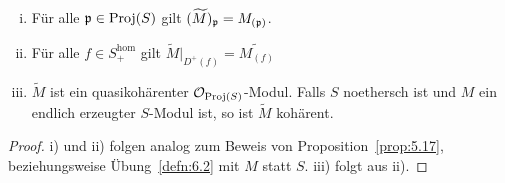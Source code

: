 \begin{prop}
\label{prop:9.17}
	\begin{enumerate}[i)]
		\item\label{prop:9.17:i} Für alle $\mathfrak{p} \in \operatorname{Proj}(S)$ gilt $(\widetilde{M})_{\mathfrak{p}} = M_{(\mathfrak{p})}$.
		\item\label{prop:9.17:ii} Für alle $f\in S_+^{\text{hom}}$ gilt $\widetilde{M}\vert_{D^+(f)} = \widetilde{M_{(f)}}$
		\item\label{prop:9.17:iii} $\widetilde{M}$ ist ein quasikohärenter $\mathcal{O}_{\operatorname{Proj}(S)}$-Modul. Falls $S$ noethersch ist und $M$ ein endlich erzeugter $S$-Modul ist, so ist $\widetilde{M}$ kohärent.
	\end{enumerate}
	\begin{proof}
		i) und ii) folgen analog zum Beweis von Proposition~\ref{prop:5.17}, beziehungsweise Übung~\ref{defn:6.2} mit $M$ statt $S$. iii) folgt aus ii).
	\end{proof}
\end{prop}
